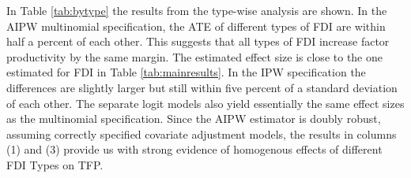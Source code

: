 \documentclass[a4paper,11pt]{scrartcl}
\begin{document}
In Table \ref{tab:bytype} the results from the type-wise analysis are shown. In the AIPW multinomial specification, the ATE of different types of FDI are within half a percent of each other. This suggests that all types of FDI increase factor productivity by the same margin. The estimated effect size is close to the one estimated for FDI in Table \ref{tab:mainresults}. In the IPW specification the differences are slightly larger but still within five percent of a standard deviation of each other.  The separate logit models also yield essentially the same effect sizes as the multinomial specification. Since the AIPW estimator is doubly robust, assuming correctly specified covariate adjustment models, the results in columns (1) and (3) provide us with strong evidence of homogenous effects of different FDI Types on TFP.

\newpage
\end{document}
